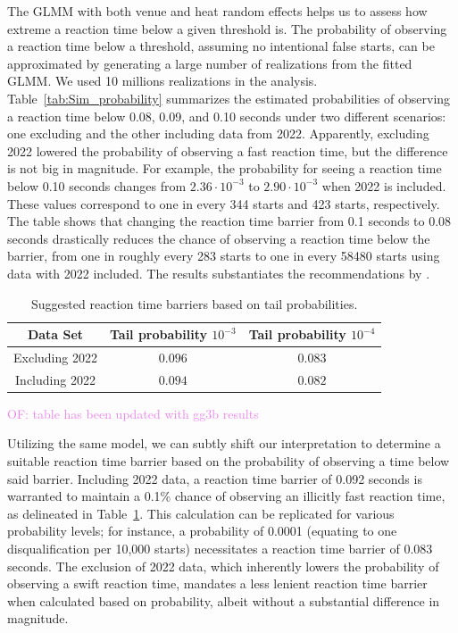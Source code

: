 \documentclass[12pt, letterpaper]{article}
\newcommand{\of}[1]{\textcolor{violet}{OF: #1}}
\begin{document}
The GLMM with both venue and heat random effects helps us to assess how extreme
a reaction time below a given threshold is. The probability of observing a reaction
time below a threshold, assuming no intentional false starts, can be
approximated by generating a large number of realizations from the fitted
GLMM. We used 10 millions realizations in the analysis. 
Table~\ref{tab:Sim_probability} summarizes the estimated probabilities of
observing a reaction time below 0.08, 0.09, and 0.10 seconds under two different
scenarios: one excluding and the other including data from 2022. Apparently,
excluding 2022 lowered the probability of observing a fast reaction time, but
the difference is not big in magnitude. For example, the probability for
seeing a reaction time below 0.10 seconds changes from $2.36\cdot 10^{-3}$ to
$2.90\cdot 10^{-3}$ when 2022 is included. These values correspond to one in
every 344 starts and 423 starts, respectively. The table shows that changing the
reaction time barrier from 0.1 seconds to 0.08 seconds drastically reduces the
chance of observing a reaction time below the barrier, from one in roughly every
283 starts to one in every 58480 starts using data with 2022 included. The
results substantiates the recommendations by \citet{komi2009iaaf}.


\begin{table}
  \centering
  \caption{Suggested reaction time barriers based on tail probabilities.}
  \begin{tabular}{c c c} 
   \toprule
   Data Set & Tail probability  $10^{-3}$ & Tail probability $10^{-4}$ \\ 
   \midrule
   Excluding 2022 & $0.096$ & $0.083$ \\ 
   Including 2022 & $0.094$ & $0.082$ \\
   \bottomrule
  \end{tabular}
  \label{tab:Sim_time}
\end{table}
\of{table has been updated with gg3b results}

Utilizing the same model, we can subtly shift our interpretation to determine a
suitable reaction time barrier based on the probability of observing a time
below said barrier. Including 2022 data, a reaction time barrier of 0.092
seconds is warranted to maintain a 0.1\% chance of observing an illicitly fast
reaction time, as delineated in Table~\ref{tab:Sim_time}. This calculation can
be replicated for various probability levels; for instance, a probability of
0.0001 (equating to one disqualification per 10,000 starts) necessitates a
reaction time barrier of 0.083 seconds. The exclusion of 2022 data, which
inherently lowers the probability of observing a swift reaction time, mandates a
less lenient reaction time barrier when calculated based on probability, albeit
without a substantial difference in magnitude.
\end{document}
